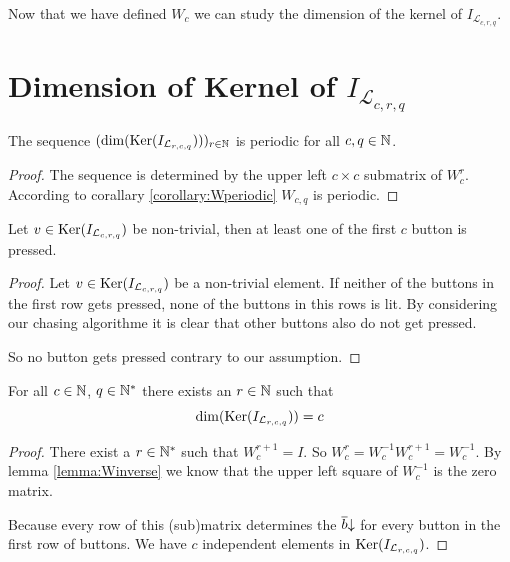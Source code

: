 Now that we have defined $W_{c}$ we can study the dimension of the kernel of
$I_{\mathcal{L}_{c,r,q}}$.

\section{Dimension of Kernel of $I_{\mathcal{L}_{c,r,q}}$}

\begin{theorem}
	The sequence $(\dim(\operatorname{Ker}(I_{\mathcal{L}_{r,c,q}})))_{r\in\mathbb{N}}$ is
	periodic for all $c,q\in \mathbb{N}$. 	
\end{theorem}

\begin{proof}
	The sequence is determined by the upper left $c \times c$ submatrix of
	$W_{c}^r$. According to corallary \ref{corollary:Wperiodic} $W_{c,q}$ is
	periodic.
\end{proof}

\begin{lemma}
	Let $v\in \operatorname{Ker}(I_{\mathcal{L}_{c,r,q}})$ be non-trivial, then at least
	one of the first $c$ button is pressed.
\end{lemma}

\begin{proof}
	Let $v\in\operatorname{Ker}(I_{\mathcal{L}_{c,r,q}})$ be a non-trivial element. If
	neither of the buttons in the first row gets pressed, none of the
	buttons in this rows is lit. By	considering our chasing algorithme it is
	clear that other buttons also do not get pressed.
	
	So no button gets pressed contrary to our assumption.
\end{proof}

\begin{proposition}\label{proposition:WpowerI}
	For all $c\in\mathbb{N}$, $q\in\mathbb{N}^{*}$ there exists an $r\in\mathbb{N}$ such that
	\[
		\dim(\operatorname{Ker}(I_{\mathcal{L}_{r,c,q}})) = c
	\]
\end{proposition}

\begin{proof}
	There exist a $r\in\mathbb{N}^{*}$ such that $W_{c}^{r+1} = I$. So $W_{c}^{r} =
	W_{c}^{-1}W_{c}^{r+1} = W_{c}^{-1}$. By lemma \ref{lemma:Winverse} we
	know that the upper left square of $W_{c}^{-1}$ is the zero matrix.
	
	Because every row of this (sub)matrix determines the $\overline{b}\negthickspace\downarrow$
	for every button in the first row of buttons. We have $c$ independent
	elements in $\operatorname{Ker}(I_{\mathcal{L}_{r,c,q}})$.
\end{proof}

